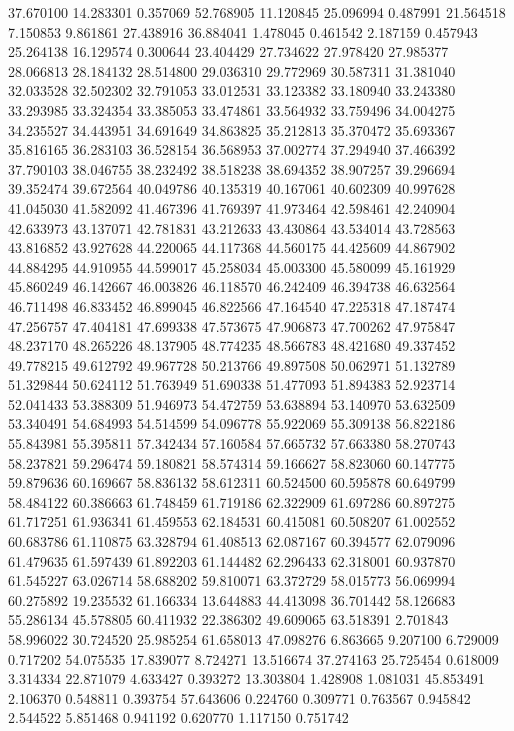 37.670100
14.283301
0.357069
52.768905
11.120845
25.096994
0.487991
21.564518
7.150853
9.861861
27.438916
36.884041
1.478045
0.461542
2.187159
0.457943
25.264138
16.129574
0.300644
23.404429
27.734622
27.978420
27.985377
28.066813
28.184132
28.514800
29.036310
29.772969
30.587311
31.381040
32.033528
32.502302
32.791053
33.012531
33.123382
33.180940
33.243380
33.293985
33.324354
33.385053
33.474861
33.564932
33.759496
34.004275
34.235527
34.443951
34.691649
34.863825
35.212813
35.370472
35.693367
35.816165
36.283103
36.528154
36.568953
37.002774
37.294940
37.466392
37.790103
38.046755
38.232492
38.518238
38.694352
38.907257
39.296694
39.352474
39.672564
40.049786
40.135319
40.167061
40.602309
40.997628
41.045030
41.582092
41.467396
41.769397
41.973464
42.598461
42.240904
42.633973
43.137071
42.781831
43.212633
43.430864
43.534014
43.728563
43.816852
43.927628
44.220065
44.117368
44.560175
44.425609
44.867902
44.884295
44.910955
44.599017
45.258034
45.003300
45.580099
45.161929
45.860249
46.142667
46.003826
46.118570
46.242409
46.394738
46.632564
46.711498
46.833452
46.899045
46.822566
47.164540
47.225318
47.187474
47.256757
47.404181
47.699338
47.573675
47.906873
47.700262
47.975847
48.237170
48.265226
48.137905
48.774235
48.566783
48.421680
49.337452
49.778215
49.612792
49.967728
50.213766
49.897508
50.062971
51.132789
51.329844
50.624112
51.763949
51.690338
51.477093
51.894383
52.923714
52.041433
53.388309
51.946973
54.472759
53.638894
53.140970
53.632509
53.340491
54.684993
54.514599
54.096778
55.922069
55.309138
56.822186
55.843981
55.395811
57.342434
57.160584
57.665732
57.663380
58.270743
58.237821
59.296474
59.180821
58.574314
59.166627
58.823060
60.147775
59.879636
60.169667
58.836132
58.612311
60.524500
60.595878
60.649799
58.484122
60.386663
61.748459
61.719186
62.322909
61.697286
60.897275
61.717251
61.936341
61.459553
62.184531
60.415081
60.508207
61.002552
60.683786
61.110875
63.328794
61.408513
62.087167
60.394577
62.079096
61.479635
61.597439
61.892203
61.144482
62.296433
62.318001
60.937870
61.545227
63.026714
58.688202
59.810071
63.372729
58.015773
56.069994
60.275892
19.235532
61.166334
13.644883
44.413098
36.701442
58.126683
55.286134
45.578805
60.411932
22.386302
49.609065
63.518391
2.701843
58.996022
30.724520
25.985254
61.658013
47.098276
6.863665
9.207100
6.729009
0.717202
54.075535
17.839077
8.724271
13.516674
37.274163
25.725454
0.618009
3.314334
22.871079
4.633427
0.393272
13.303804
1.428908
1.081031
45.853491
2.106370
0.548811
0.393754
57.643606
0.224760
0.309771
0.763567
0.945842
2.544522
5.851468
0.941192
0.620770
1.117150
0.751742
